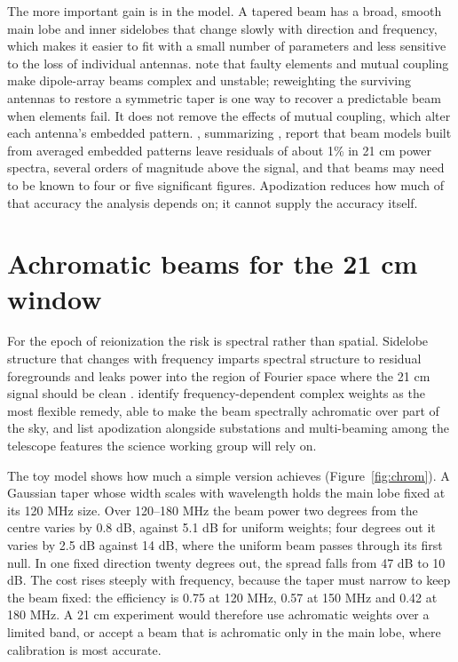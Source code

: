 \documentclass[11pt,a4paper]{article}
\begin{document}
The more important gain is in the model. A tapered beam has a broad, smooth main lobe and inner sidelobes that change slowly with direction and frequency, which makes it easier to fit with a small number of parameters and less sensitive to the loss of individual antennas. \citet{Burba2026} note that faulty elements and mutual coupling make dipole-array beams complex and unstable; reweighting the surviving antennas to restore a symmetric taper is one way to recover a predictable beam when elements fail. It does not remove the effects of mutual coupling, which alter each antenna's embedded pattern. \citet{deLeraAcedo2026}, summarizing \citet{OHara2025}, report that beam models built from averaged embedded patterns leave residuals of about 1\% in 21 cm power spectra, several orders of magnitude above the signal, and that beams may need to be known to four or five significant figures. Apodization reduces how much of that accuracy the analysis depends on; it cannot supply the accuracy itself.

\section{Achromatic beams for the 21 cm window}

For the epoch of reionization the risk is spectral rather than spatial. Sidelobe structure that changes with frequency imparts spectral structure to residual foregrounds and leaks power into the region of Fourier space where the 21 cm signal should be clean \citep{Trott2026}. \citet{Trott2026} identify frequency-dependent complex weights as the most flexible remedy, able to make the beam spectrally achromatic over part of the sky, and list apodization alongside substations and multi-beaming among the telescope features the science working group will rely on.

The toy model shows how much a simple version achieves (Figure~\ref{fig:chrom}). A Gaussian taper whose width scales with wavelength holds the main lobe fixed at its 120 MHz size. Over 120--180 MHz the beam power two degrees from the centre varies by 0.8 dB, against 5.1 dB for uniform weights; four degrees out it varies by 2.5 dB against 14 dB, where the uniform beam passes through its first null. In one fixed direction twenty degrees out, the spread falls from 47 dB to 10 dB. The cost rises steeply with frequency, because the taper must narrow to keep the beam fixed: the efficiency is 0.75 at 120 MHz, 0.57 at 150 MHz and 0.42 at 180 MHz. A 21 cm experiment would therefore use achromatic weights over a limited band, or accept a beam that is achromatic only in the main lobe, where calibration is most accurate.
\end{document}
